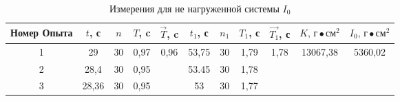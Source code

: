 \begin{table}
    \centering

    \begin{tabular}{|c|c|c|c|c|c|c|c|c|c|c|}
        \hline
        Номер Опыта & $t$, с & $n$ & $T$, c &  $\vec{T}$, c       & $t_1$, с & $n_1$ & $T_1$, с & $\vec{T_1}$, с        & $K \text{, г}\bullet\text{см}^2$ & $I_0\text{, г}\bullet\text{см}^2$ \\
        \hline
                  1 & 29     & 30  & 0,97   &\multirow{3}{*}{0,96}& 53,75    &  30   & 1,79     & \multirow{3}{*}{1,78} & \multirow{1}{*}{13067,38}        & \multirow{3}{*}{5360,02}          \\
        \hline
                  2 & 28,4   & 30  & 0,95   &                     & 53.45    &  30   & 1,78     &                       &                                  &                                   \\
        \hline
                  3 & 28,36  & 30  & 0,95   &                     & 53       &  30   & 1,77     &                       &                                  &                                   \\
        \hline
    \end{tabular}

    \caption{Измерения для не нагруженной системы $I_0$} \label{table-1}
\end{table}